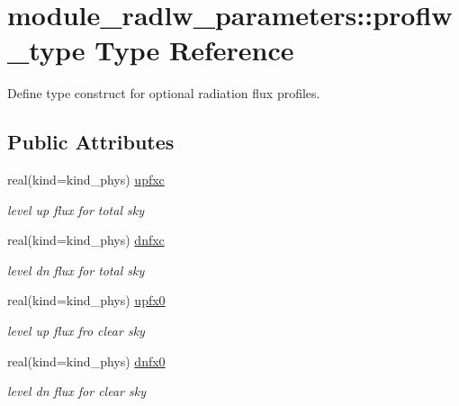 \hypertarget{structmodule__radlw__parameters_1_1proflw__type}{}\section{module\+\_\+radlw\+\_\+parameters\+:\+:proflw\+\_\+type Type Reference}
\label{structmodule__radlw__parameters_1_1proflw__type}


Define type construct for optional radiation flux profiles.  


\subsection*{Public Attributes}
\textbf{ }\par
\begin{DoxyCompactItemize}
\item 
\mbox{\label{structmodule__radlw__parameters_1_1proflw__type_aefd4bfa2053b7e88173ac73ca219a9b2}} 
real(kind=kind\+\_\+phys) \hyperlink{structmodule__radlw__parameters_1_1proflw__type_aefd4bfa2053b7e88173ac73ca219a9b2}{upfxc}
\begin{DoxyCompactList}\small\item\em level up flux for total sky \end{DoxyCompactList}\item 
\mbox{\label{structmodule__radlw__parameters_1_1proflw__type_a5f7ae4abe7912e8dbe371b577ba91945}} 
real(kind=kind\+\_\+phys) \hyperlink{structmodule__radlw__parameters_1_1proflw__type_a5f7ae4abe7912e8dbe371b577ba91945}{dnfxc}
\begin{DoxyCompactList}\small\item\em level dn flux for total sky \end{DoxyCompactList}\item 
\mbox{\label{structmodule__radlw__parameters_1_1proflw__type_a90ec3938bb024acfd6f78d597890e78a}} 
real(kind=kind\+\_\+phys) \hyperlink{structmodule__radlw__parameters_1_1proflw__type_a90ec3938bb024acfd6f78d597890e78a}{upfx0}
\begin{DoxyCompactList}\small\item\em level up flux fro clear sky \end{DoxyCompactList}\item 
\mbox{\label{structmodule__radlw__parameters_1_1proflw__type_a4804a215b761165846e87428b3f3c12c}} 
real(kind=kind\+\_\+phys) \hyperlink{structmodule__radlw__parameters_1_1proflw__type_a4804a215b761165846e87428b3f3c12c}{dnfx0}
\begin{DoxyCompactList}\small\item\em level dn flux for clear sky \end{DoxyCompactList}\end{DoxyCompactItemize}



